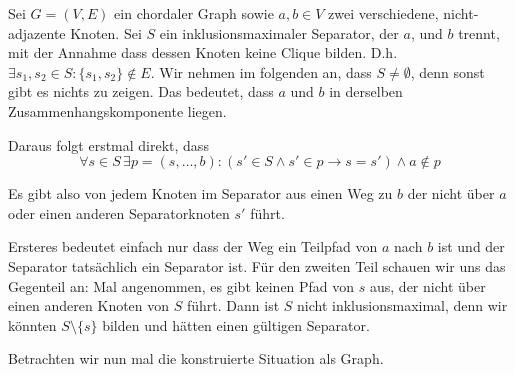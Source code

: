 

\DeclareMathOperator{\vc}{vc}






\subexercise
\label{sec:sep-clique}

Sei $G = (V,E)$ ein chordaler Graph sowie $a,b \in V$ zwei verschiedene, nicht-adjazente Knoten. Sei $S$ ein inklusionsmaximaler Separator, der $a$, und $b$ trennt, mit der Annahme dass dessen Knoten keine Clique bilden. D.h.
$\exists s_1, s_2 \in S \colon \{s_1, s_2\} \notin E$.
Wir nehmen im folgenden an, dass $S \neq \emptyset$, denn sonst gibt es nichts zu zeigen. Das bedeutet, dass $a$ und $b$ in derselben Zusammenhangskomponente liegen.

Daraus folgt erstmal direkt, dass $$\forall s \in S \, \exists p = (s, \dots, b) \colon (s' \in S \wedge s' \in p \rightarrow s = s') \wedge a \notin p$$

Es gibt also von jedem Knoten im Separator aus einen Weg zu $b$ der nicht über $a$ oder einen anderen Separatorknoten $s'$ führt.

Ersteres bedeutet einfach nur dass der Weg ein Teilpfad von $a$ nach $b$ ist und der Separator tatsächlich ein Separator ist. Für den zweiten Teil schauen wir uns das Gegenteil an:
Mal angenommen, es gibt keinen Pfad von $s$ aus, der nicht über einen anderen Knoten von $S$ führt. Dann ist $S$ nicht inklusionsmaximal, denn wir könnten $S \setminus \{s\}$ bilden und hätten einen gültigen Separator.

Betrachten wir nun mal die konstruierte Situation als Graph.


